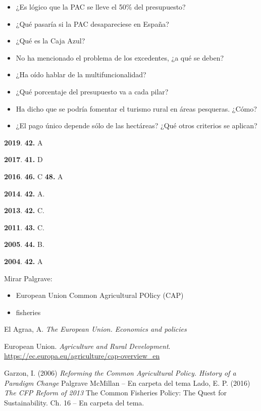 \documentclass{nuevotema}
\begin{document}
\begin{itemize}
    \item ¿Es lógico que la PAC se lleve el 50\% del presupuesto?
    \item ¿Qué pasaría si la PAC desapareciese en España?
    \item ¿Qué es la Caja Azul?
    \item No ha mencionado el problema de los excedentes, ¿a qué se deben?
    \item ¿Ha oído hablar de la multifuncionalidad?
    \item ¿Qué porcentaje del presupuesto va a cada pilar?
    \item Ha dicho que se podría fomentar el turismo rural en áreas pesqueras. ¿Cómo?
    \item ¿El pago único depende sólo de las hectáreas? ¿Qué otros criterios se aplican?
\end{itemize}


\notas

\textbf{2019}. \textbf{42.} A

\textbf{2017}. \textbf{41.} D

\textbf{2016}. \textbf{46.} C \textbf{48.} A

\textbf{2014}. \textbf{42.} A.

\textbf{2013}. \textbf{42.} C.

\textbf{2011}. \textbf{43.} C.

\textbf{2005}. \textbf{44.} B.

\textbf{2004}. \textbf{42.} A


\bibliografia

Mirar Palgrave:
\begin{itemize}
	\item European Union Common Agricultural POlicy (CAP)
	\item fisheries
\end{itemize}

El Agraa, A. \textit{The European Union. Economics and policies}


European Union. \textit{Agriculture and Rural Development}. \url{https://ec.europa.eu/agriculture/cap-overview_en}

Garzon, I. (2006) \textit{Reforming the Common Agricultural Policy. History of a Paradigm Change} Palgrave McMillan -- En carpeta del tema
Lado, E. P. (2016) \textit{The CFP Reform of 2013} The Common Fisheries Policy: The Quest for Sustainability. Ch. 16 -- En carpeta del tema.
\end{document}
